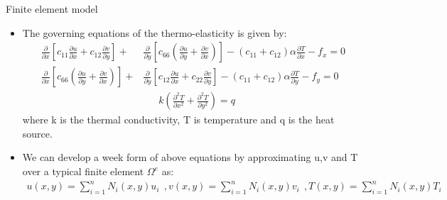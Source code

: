 \documentclass{beamer}
\begin{document}
   \begin{frame}[t,fragile]{Finite element model}
    \begin{itemize}
        \item The governing equations of the thermo-elasticity is given by:
            \bgroup
            \tiny
            \begin{align*}
    \frac{\partial}{\partial x}\left[c_{11}\frac{\partial u}{\partial x}+c_{12}\frac{\partial v}{\partial y}\right]+&\frac{\partial}{\partial y}\left[c_{66}\left(\frac{\partial u}{\partial y}+\frac{\partial v}{\partial x}\right)\right]-(c_{11}+c_{12})\alpha\frac{\partial T}{\partial x}-f_x   =0 \\
    \frac{\partial}{\partial x}\left[c_{66}\left(\frac{\partial u}{\partial y}+\frac{\partial v}{\partial x}\right)\right]+&\frac{\partial}{\partial y}\left[c_{12}\frac{\partial u}{\partial x}+c_{22}\frac{\partial v}{\partial y}\right]-(c_{11}+c_{12})\alpha\frac{\partial T}{\partial y}-f_y=0\\
    &\ \ \ \ \ \ \ k\left( \frac{\partial^2 T}{\partial x^2}+\frac{\partial^2 T}{\partial y^2} \right)=q
\end{align*}
\egroup
where k is the thermal conductivity, T is temperature and q is the heat source.
      \item We can develop a week form of above equations by approximating u,v and T over a typical finite element $\Omega^e$ as:
          \footnotesize
\begin{align*}
    u(x,y)=\sum_{i=1}^nN_i (x,y)u_i\ \ , 
    v(x,y)=\sum_{i=1}^nN_i (x,y)v_i\ \ ,
    T(x,y)=\sum_{i=1}^nN_i (x,y)T_i
\end{align*}
\end{itemize}
\end{frame}
\end{document}
